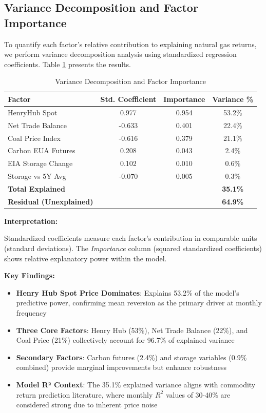 \documentclass[12pt,a4paper]{article}
\begin{document}
\subsection{Variance Decomposition and Factor Importance}

To quantify each factor's relative contribution to explaining natural gas returns, we perform variance decomposition analysis using standardized regression coefficients. Table \ref{tab:variance_decomposition} presents the results.

\begin{table}[H]
\centering
\caption{Variance Decomposition and Factor Importance}
\label{tab:variance_decomposition}
\begin{tabular}{@{}lccc@{}}
\toprule
\textbf{Factor} & \textbf{Std. Coefficient} & \textbf{Importance} & \textbf{Variance \%} \\
\midrule
HenryHub Spot & 0.977 & 0.954 & 53.2\% \\
Net Trade Balance & -0.633 & 0.401 & 22.4\% \\
Coal Price Index & -0.616 & 0.379 & 21.1\% \\
Carbon EUA Futures & 0.208 & 0.043 & 2.4\% \\
EIA Storage Change & 0.102 & 0.010 & 0.6\% \\
Storage vs 5Y Avg & -0.070 & 0.005 & 0.3\% \\
\midrule
\textbf{Total Explained} & & & \textbf{35.1\%} \\
\textbf{Residual (Unexplained)} & & & \textbf{64.9\%} \\
\bottomrule
\end{tabular}
\end{table}

\textbf{Interpretation:}

Standardized coefficients measure each factor's contribution in comparable units (standard deviations). The \textit{Importance} column (squared standardized coefficients) shows relative explanatory power within the model.

\textbf{Key Findings:}

\begin{itemize}
    \item \textbf{Henry Hub Spot Price Dominates}: Explains 53.2\% of the model's predictive power, confirming mean reversion as the primary driver at monthly frequency

    \item \textbf{Three Core Factors}: Henry Hub (53\%), Net Trade Balance (22\%), and Coal Price (21\%) collectively account for 96.7\% of explained variance

    \item \textbf{Secondary Factors}: Carbon futures (2.4\%) and storage variables (0.9\% combined) provide marginal improvements but enhance robustness

    \item \textbf{Model R² Context}: The 35.1\% explained variance aligns with commodity return prediction literature, where monthly $R^2$ values of 30-40\% are considered strong due to inherent price noise
\end{itemize}
\end{document}
